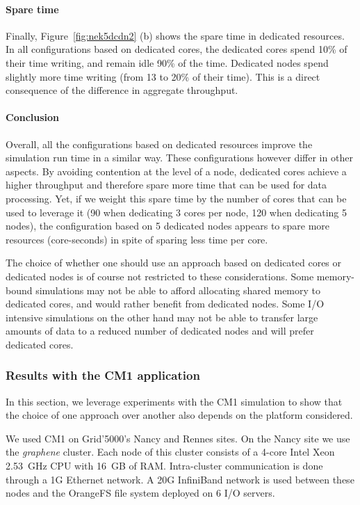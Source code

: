 \paragraph{Spare time}
Finally, Figure~\ref{fig:nek5dcdn2} (b) shows the spare time in dedicated resources. In all configurations
based on dedicated cores, the dedicated cores spend 10\% of their time writing, and remain idle 90\% of the time.
Dedicated nodes spend slightly more time writing (from 13 to 20\% of their time). This is a direct consequence
of the difference in aggregate throughput.

\paragraph{Conclusion}
Overall, all the configurations based on dedicated resources improve the simulation run time in a similar way.
These configurations however differ in other aspects. By avoiding contention at the level of a node, 
dedicated cores achieve a higher throughput and
therefore spare more time that can be used for data processing. Yet, if we weight this spare time
by the number of cores that can be used to leverage it (90 when dedicating 3 cores per node, 120 when
dedicating 5 nodes), the configuration based on 5 dedicated nodes appears to spare more resources (core-seconds)
in spite of sparing less time per core.

The choice of whether one should use an approach based on dedicated cores or dedicated nodes is of
course not restricted to these considerations. Some memory-bound simulations may not be able to afford 
allocating shared memory to dedicated cores, and would rather benefit from dedicated nodes. 
Some I/O intensive simulations on the other hand may not be able to transfer large amounts of data 
to a reduced number of dedicated nodes and will prefer dedicated cores.

\subsubsection{Results with the CM1 application}

In this section, we leverage experiments with the CM1 simulation to show that the choice of one 
approach over another also depends on the platform considered.

We used CM1 on Grid'5000's Nancy and Rennes sites.
On the Nancy site we use the \emph{graphene} cluster. Each node of this cluster consists of a 4-core
Intel Xeon 2.53~GHz CPU with 16~GB of RAM. Intra-cluster communication is done through a 1G Ethernet network.
A 20G InfiniBand network is used between these nodes and the OrangeFS file system deployed on 6 I/O servers.

